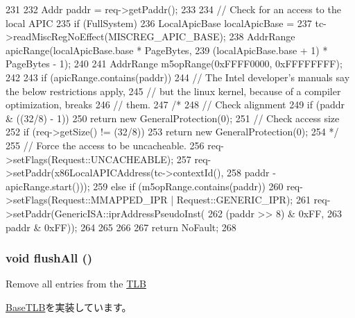 \begin{DoxyCode}
231 {
232     Addr paddr = req->getPaddr();
233 
234     // Check for an access to the local APIC
235     if (FullSystem) {
236         LocalApicBase localApicBase =
237             tc->readMiscRegNoEffect(MISCREG_APIC_BASE);
238         AddrRange apicRange(localApicBase.base * PageBytes,
239                             (localApicBase.base + 1) * PageBytes - 1);
240 
241         AddrRange m5opRange(0xFFFF0000, 0xFFFFFFFF);
242 
243         if (apicRange.contains(paddr)) {
244             // The Intel developer's manuals say the below restrictions apply,
245             // but the linux kernel, because of a compiler optimization, breaks
246             // them.
247             /*
248             // Check alignment
249             if (paddr & ((32/8) - 1))
250                 return new GeneralProtection(0);
251             // Check access size
252             if (req->getSize() != (32/8))
253                 return new GeneralProtection(0);
254             */
255             // Force the access to be uncacheable.
256             req->setFlags(Request::UNCACHEABLE);
257             req->setPaddr(x86LocalAPICAddress(tc->contextId(),
258                                               paddr - apicRange.start()));
259         } else if (m5opRange.contains(paddr)) {
260             req->setFlags(Request::MMAPPED_IPR | Request::GENERIC_IPR);
261             req->setPaddr(GenericISA::iprAddressPseudoInst(
262                               (paddr >> 8) & 0xFF,
263                               paddr & 0xFF));
264         }
265     }
266 
267     return NoFault;
268 }
\end{DoxyCode}
\hypertarget{classX86ISA_1_1TLB_aca1483a67aee5a91e442f7131d66bcbd}{
\subsubsection[{flushAll}]{\setlength{\rightskip}{0pt plus 5cm}void flushAll ()}}
\label{classX86ISA_1_1TLB_aca1483a67aee5a91e442f7131d66bcbd}
Remove all entries from the \hyperlink{classX86ISA_1_1TLB}{TLB} 

\hyperlink{classBaseTLB_a5958bc92949a47d1be1088468abdc006}{BaseTLB}を実装しています。


